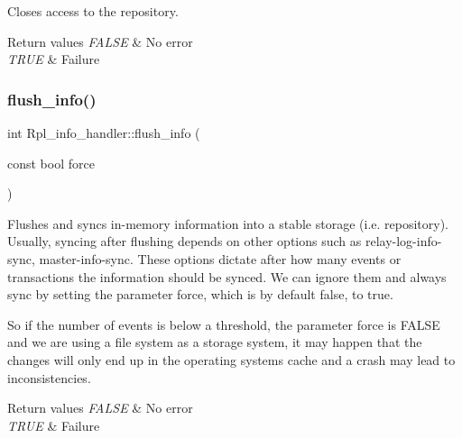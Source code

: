 Closes access to the repository.


\begin{DoxyRetVals}{Return values}
{\em F\+A\+L\+SE} & No error \\
\hline
{\em T\+R\+UE} & Failure \\
\hline
\end{DoxyRetVals}
\mbox{\label{classRpl__info__handler_a9a1543acf68477c3b89620d422fbd7f7}} 
\subsubsection{\texorpdfstring{flush\+\_\+info()}{flush\_info()}}
{\footnotesize\ttfamily int Rpl\+\_\+info\+\_\+handler\+::flush\+\_\+info (\begin{DoxyParamCaption}\item[{const bool}]{force }\end{DoxyParamCaption})\hspace{0.3cm}{\ttfamily [inline]}}

Flushes and syncs in-\/memory information into a stable storage (i.\+e. repository). Usually, syncing after flushing depends on other options such as {\ttfamily relay-\/log-\/info-\/sync}, {\ttfamily master-\/info-\/sync}. These options dictate after how many events or transactions the information should be synced. We can ignore them and always sync by setting the parameter {\ttfamily force}, which is by default {\ttfamily false}, to {\ttfamily true}.

So if the number of events is below a threshold, the parameter {\ttfamily force} is F\+A\+L\+SE and we are using a file system as a storage system, it may happen that the changes will only end up in the operating system\textquotesingle{}s cache and a crash may lead to inconsistencies.


\begin{DoxyRetVals}{Return values}
{\em F\+A\+L\+SE} & No error \\
\hline
{\em T\+R\+UE} & Failure \\
\hline
\end{DoxyRetVals}
\mbox{\label{classRpl__info__handler_ab2547938ea10aa15a23549cb69c69393}} 
